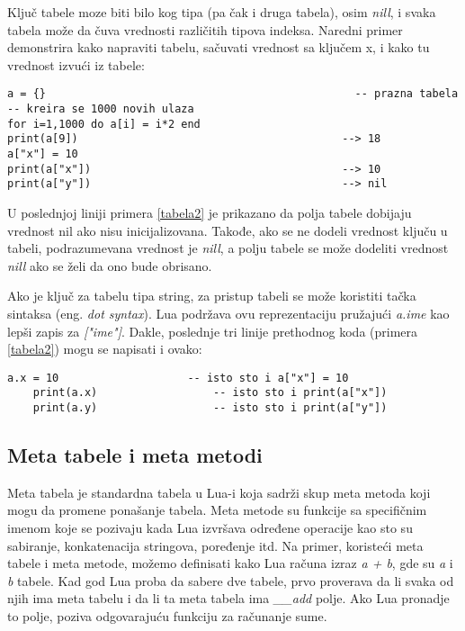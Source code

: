 \documentclass[a4paper]{article}
\begin{document}
Ključ tabele moze biti bilo kog tipa (pa čak i druga tabela), osim \textit{nill}, i svaka tabela može da čuva vrednosti različitih tipova indeksa. Naredni primer demonstrira kako napraviti tabelu, sačuvati vrednost sa ključem x, i kako tu vrednost izvući iz tabele:
\begin{lstlisting}[caption={Kreiranje tabele, dodeljivanje i vraćanje vrednosti},frame=single, label=tabela2]
a = {}										          -- prazna tabela
-- kreira se 1000 novih ulaza
for i=1,1000 do a[i] = i*2 end
print(a[9])    										--> 18
a["x"] = 10
print(a["x"])  										--> 10
print(a["y"])  										--> nil
\end{lstlisting}
U poslednjoj liniji primera \ref{tabela2} je prikazano da polja tabele dobijaju vrednost nil ako nisu inicijalizovana. Takođe, ako se ne dodeli vrednost ključu u tabeli, podrazumevana vrednost je \textit{nill}, a polju tabele se može dodeliti vrednost \textit{nill} ako se želi da ono bude obrisano.

Ako je ključ za tabelu tipa string, za pristup tabeli se može koristiti tačka sintaksa (eng. \textit{dot syntax}). Lua podržava ovu reprezentaciju pružajući \textit{a.ime} kao lepši zapis za \textit{["ime"]}. Dakle, poslednje tri linije prethodnog koda (primera \ref{tabela2}) mogu se napisati i ovako:
\begin{lstlisting}[caption={Primer čuvanja vrednosti u tabeli},frame=single, label=tabela3]
    a.x = 10                    -- isto sto i a["x"] = 10
    print(a.x)                  -- isto sto i print(a["x"])
    print(a.y)                  -- isto sto i print(a["y"])
\end{lstlisting}

\subsection*{Meta tabele i meta metodi}
Meta tabela je standardna tabela u Lua-i koja sadrži skup meta metoda koji mogu da promene ponašanje tabela. Meta metode su funkcije sa specifičnim imenom koje se pozivaju kada Lua izvršava određene operacije kao sto su sabiranje, konkatenacija stringova, poređenje itd. Na primer, koristeći meta tabele i meta metode, možemo definisati kako Lua računa izraz \textit{a + b}, gde su \textit{a} i \textit{b} tabele. Kad god Lua proba da sabere dve tabele, prvo proverava da li svaka od njih ima meta tabelu i da li ta meta tabela ima \textit{\_\_add} polje. Ako Lua pronadje to polje, poziva odgovarajuću funkciju za računanje sume.
\end{document}

